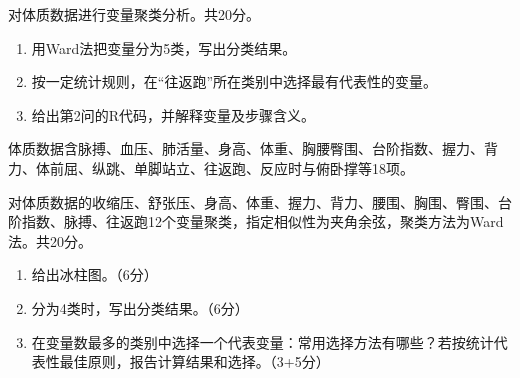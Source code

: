 \par\addvspace{6pt}\noindent\begin{minipage}{\linewidth}


对体质数据进行变量聚类分析。共20分。

\begin{enumerate}
\def\labelenumi{\arabic{enumi}.}
\tightlist
\item
  用Ward法把变量分为5类，写出分类结果。
\item
  按一定统计规则，在``往返跑''所在类别中选择最有代表性的变量。
\item
  给出第2问的R代码，并解释变量及步骤含义。
\end{enumerate}

体质数据含脉搏、血压、肺活量、身高、体重、胸腰臀围、台阶指数、握力、背力、体前屈、纵跳、单脚站立、往返跑、反应时与俯卧撑等18项。



\end{minipage}\par\vspace{4pt}

\par\addvspace{6pt}\noindent\begin{minipage}{\linewidth}


对体质数据的收缩压、舒张压、身高、体重、握力、背力、腰围、胸围、臀围、台阶指数、脉搏、往返跑12个变量聚类，指定相似性为夹角余弦，聚类方法为Ward法。共20分。

\begin{enumerate}
\def\labelenumi{\arabic{enumi}.}
\tightlist
\item
  给出冰柱图。（6分）
\item
  分为4类时，写出分类结果。（6分）
\item
  在变量数最多的类别中选择一个代表变量：常用选择方法有哪些？若按统计代表性最佳原则，报告计算结果和选择。（3+5分）
\end{enumerate}



\end{minipage}\par\vspace{4pt}

